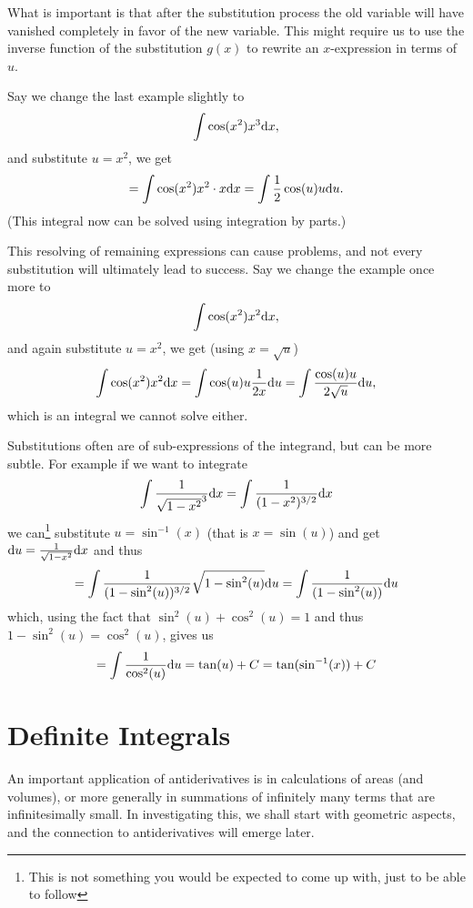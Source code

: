 What is important is that after the substitution process 
the old variable will have vanished completely in favor of the new variable.
This might require us to use the inverse function of the substitution $g(x)$
to rewrite an $x$-expression in terms of $u$.

Say we change the last example slightly to
\[
\int\cos(x^2)x^3{\mbox{d}}x,
\]
and substitute $u=x^2$, we get
\[
=\int\cos(x^2) x^2\cdot x{\mbox{d}}x=\int\frac12 \cos(u)u{\mbox{d}}u.
\]
(This integral now can be solved using integration by parts.)

This resolving of remaining expressions can cause problems, and not every
substitution will ultimately lead to success. Say we change the example once
more to
\[
\int\cos(x^2)x^2{\mbox{d}}x,
\]
and again substitute $u=x^2$, we get (using $x=\sqrt{u}$)
\[
\int\cos(x^2) x^2 {\mbox{d}}x=\int\cos(u)u\frac{1}{2x}{\mbox{d}}u
=\int\frac{\cos(u)u}{2\sqrt{u}}{\mbox{d}}u,
\]
which is an integral we cannot solve either.
\smallskip

Substitutions often are of sub-expressions of the integrand, but can be more
subtle. For example if we want to integrate
\[
\int \frac{1}{\sqrt{1-x^2}^3}{\mbox{d}}x
=\int \frac{1}{(1-x^2)^{3/2}}{\mbox{d}}x
\]
we can\footnote{This is not something you would be expected to come up
with, just to be able to follow} substitute $u=\sin^{-1}(x)$ (that is
$x=\sin(u)$) and get ${\mbox{d}}u=\frac{1}{\sqrt{1-x^2}}{\mbox{d}}x$ and thus
\[
=\int \frac{1}{(1-\sin^2(u))^{3/2}}\sqrt{1-\sin^2(u)}{\mbox{d}}u
=\int \frac{1}{(1-\sin^2(u))}{\mbox{d}}u
\]
which, using the fact that $\sin^2(u)+\cos^2(u)=1$ and thus
$1-\sin^2(u)=\cos^2(u)$, gives us
\[
=\int \frac{1}{\cos^2(u)}{\mbox{d}}u=\tan(u)+C=\tan(\sin^{-1}(x))+C
\]


\section{Definite Integrals}
\label{RiemannIntegral}

An important application of antiderivatives is in calculations of areas (and
volumes), or more generally in summations of infinitely many terms that are
infinitesimally small.
In investigating this, we shall start with geometric aspects, and the
connection to antiderivatives will emerge later.
\smallskip

